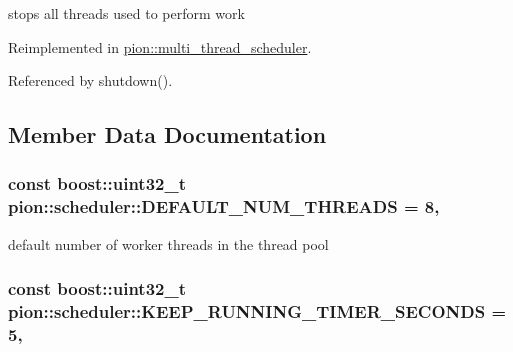 stops all threads used to perform work 



Reimplemented in \hyperlink{classpion_1_1multi__thread__scheduler_a91945cc6c4a05a716fec36fc48474265}{pion\-::multi\-\_\-thread\-\_\-scheduler}.



Referenced by shutdown().



\subsection{Member Data Documentation}
\hypertarget{classpion_1_1scheduler_ab8d6ac8ea6a3946abe86cbd20f0783e0}{
\subsubsection[{D\-E\-F\-A\-U\-L\-T\-\_\-\-N\-U\-M\-\_\-\-T\-H\-R\-E\-A\-D\-S}]{\setlength{\rightskip}{0pt plus 5cm}const boost\-::uint32\-\_\-t pion\-::scheduler\-::\-D\-E\-F\-A\-U\-L\-T\-\_\-\-N\-U\-M\-\_\-\-T\-H\-R\-E\-A\-D\-S = 8\hspace{0.3cm}{\ttfamily [static]}, {\ttfamily [protected]}}}\label{classpion_1_1scheduler_ab8d6ac8ea6a3946abe86cbd20f0783e0}


default number of worker threads in the thread pool 

\hypertarget{classpion_1_1scheduler_a4f2047f8ecdaf5901f3548ee693b39ce}{
\subsubsection[{K\-E\-E\-P\-\_\-\-R\-U\-N\-N\-I\-N\-G\-\_\-\-T\-I\-M\-E\-R\-\_\-\-S\-E\-C\-O\-N\-D\-S}]{\setlength{\rightskip}{0pt plus 5cm}const boost\-::uint32\-\_\-t pion\-::scheduler\-::\-K\-E\-E\-P\-\_\-\-R\-U\-N\-N\-I\-N\-G\-\_\-\-T\-I\-M\-E\-R\-\_\-\-S\-E\-C\-O\-N\-D\-S = 5\hspace{0.3cm}{\ttfamily [static]}, {\ttfamily [protected]}}}\label{classpion_1_1scheduler_a4f2047f8ecdaf5901f3548ee693b39ce}


